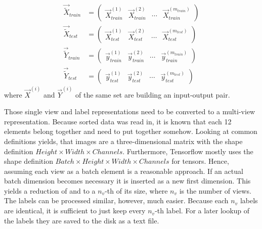 \begin{subequations}
	\begin{align}
		\label{eq:list-x-train}
		\vec{\tilde{X}}_{train} &=
		\begin{pmatrix}
			\vec{X}_{train}^{(1)} & \vec{X}_{train}^{(2)} & \cdots & \vec{X}_{train}^{(m_{train})}
		\end{pmatrix}
		\\
		\label{eq:list-x-test}
		\vec{\tilde{X}}_{test} &=
		\begin{pmatrix}
			\vec{X}_{test}^{(1)} & \vec{X}_{test}^{(2)} & \cdots & \vec{X}_{test}^{(m_{test})}
		\end{pmatrix}
		\\
		\label{eq:list-y-train}
		\vec{\tilde{Y}}_{train} &=
		\begin{pmatrix}
			\vec{y}_{train}^{(1)} & \vec{y}_{train}^{(2)} & \cdots & \vec{y}_{train}^{(m_{train})}
		\end{pmatrix}
		\\
		\label{eq:list-y-test}
		\vec{\tilde{Y}}_{test} &=
		\begin{pmatrix}
			\vec{y}_{test}^{(1)} & \vec{y}_{test}^{(2)} & \cdots & \vec{y}_{test}^{(m_{test})}
		\end{pmatrix}
	\end{align}
\end{subequations}
where $\vec{X}^{(i)}$ and $\vec{Y}^{(i)}$ of the same set are building an input-output pair.

Those single view and label representations need to be converted to a multi-view representation.
Because sorted data was read in, it is known that each 12 elements belong together and need to put together somehow.
Looking at common definitions yields, that images are a three-dimensional matrix with the shape definition $Height \times Width \times Channels$.
Furthermore, Tensorflow mostly uses the shape definition $Batch \times Height \times Width \times Channels$ for tensors.
Hence, assuming each view as a batch element is a reasonable approach.
If an actual batch dimension becomes necessary it is inserted as a new first dimension.
This yields a reduction of  and  to a $n_v$-th of its size, where $n_v$ is the number of views.
The labels can be processed similar, however, much easier.
Because each $n_v$ labels are identical, it is sufficient to just keep every $n_v$-th label.
For a later lookup of the labels they are saved to the disk as a text file.